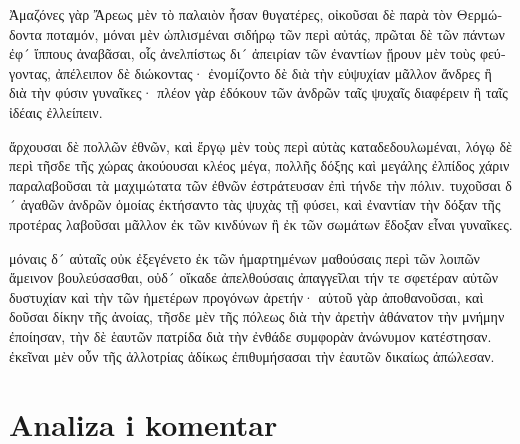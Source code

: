 \medskip


{\large

\begin{greek}

\noindent Ἀμαζόνες γὰρ Ἄρεως μὲν τὸ παλαιὸν ἦσαν θυγατέρες, οἰκοῦσαι δὲ παρὰ τὸν Θερμώδοντα ποταμόν, μόναι μὲν ὡπλισμέναι σιδήρῳ τῶν περὶ αὐτάς, πρῶται δὲ τῶν πάντων ἐφ´ ἵππους ἀναβᾶσαι, οἷς ἀνελπίστως δι´ ἀπειρίαν τῶν ἐναντίων ᾕρουν μὲν τοὺς φεύγοντας, ἀπέλειπον δὲ διώκοντας· ἐνομίζοντο δὲ διὰ τὴν εὐψυχίαν μᾶλλον ἄνδρες ἢ διὰ τὴν φύσιν γυναῖκες· πλέον γὰρ ἐδόκουν τῶν ἀνδρῶν ταῖς ψυχαῖς διαφέρειν ἢ ταῖς ἰδέαις ἐλλείπειν.

ἄρχουσαι δὲ πολλῶν ἐθνῶν, καὶ ἔργῳ μὲν τοὺς περὶ αὐτὰς καταδεδουλωμέναι, λόγῳ δὲ περὶ τῆσδε τῆς χώρας ἀκούουσαι κλέος μέγα, πολλῆς δόξης καὶ μεγάλης ἐλπίδος χάριν παραλαβοῦσαι τὰ μαχιμώτατα τῶν ἐθνῶν ἐστράτευσαν ἐπὶ τήνδε τὴν πόλιν. τυχοῦσαι δ´ ἀγαθῶν ἀνδρῶν ὁμοίας ἐκτήσαντο τὰς ψυχὰς τῇ φύσει, καὶ ἐναντίαν τὴν δόξαν τῆς προτέρας λαβοῦσαι μᾶλλον ἐκ τῶν κινδύνων ἢ ἐκ τῶν σωμάτων ἔδοξαν εἶναι γυναῖκες.

μόναις δ´ αὐταῖς οὐκ ἐξεγένετο ἐκ τῶν ἡμαρτημένων μαθούσαις περὶ τῶν λοιπῶν ἄμεινον βουλεύσασθαι, οὐδ´ οἴκαδε ἀπελθούσαις ἀπαγγεῖλαι τήν τε σφετέραν αὐτῶν δυστυχίαν καὶ τὴν τῶν ἡμετέρων προγόνων ἀρετήν· αὐτοῦ γὰρ ἀποθανοῦσαι, καὶ δοῦσαι δίκην τῆς ἀνοίας, τῆσδε μὲν τῆς πόλεως διὰ τὴν ἀρετὴν ἀθάνατον τὴν μνήμην ἐποίησαν, τὴν δὲ ἑαυτῶν πατρίδα διὰ τὴν ἐνθάδε συμφορὰν ἀνώνυμον κατέστησαν. ἐκεῖναι μὲν οὖν τῆς ἀλλοτρίας ἀδίκως ἐπιθυμήσασαι τὴν ἑαυτῶν δικαίως ἀπώλεσαν.

\end{greek}

}

\newpage

\section*{Analiza i komentar}


